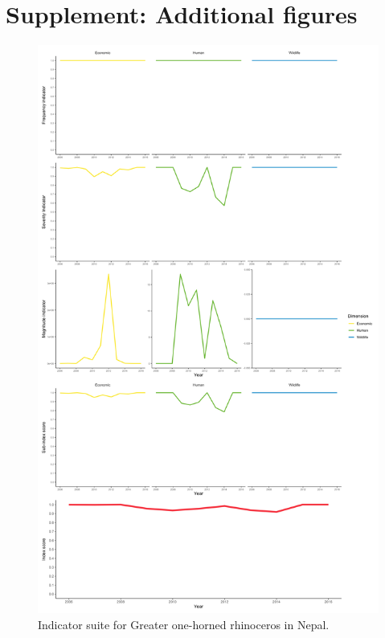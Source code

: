 \documentclass[fleqn,10pt]{olplainarticle}
\begin{document}
\section*{Supplement: Additional figures}
\begin{figure}[!ht]
    \centering
    \includegraphics[width = 1\textwidth]{rhino_all.png}
    \caption{Indicator suite for Greater one-horned rhinoceros in Nepal.}
    \label{fig:rhino}
\end{figure}
\end{document}
